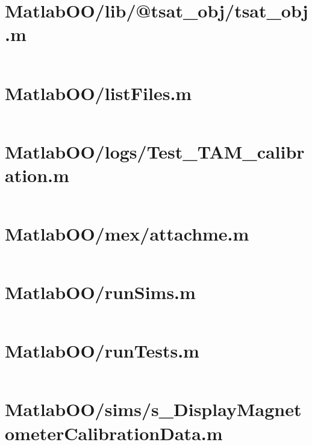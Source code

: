 \pagebreak
\section{MatlabOO/lib/@tsat\_obj/tsat\_obj.m}\label{code:MatlabOO/lib/@tsat_obj/tsat_obj.m}
\inputminted[linenos,fontsize=\scriptsize]{matlab}{/home/dcouture/git/mathyourlife/TSatPy/beta_versions/matlab_object_oriented/lib/@tsat_obj/tsat_obj.m}

\pagebreak
\section{MatlabOO/listFiles.m}\label{code:MatlabOO/listFiles.m}
\inputminted[linenos,fontsize=\scriptsize]{matlab}{/home/dcouture/git/mathyourlife/TSatPy/beta_versions/matlab_object_oriented/listFiles.m}

\pagebreak
\section{MatlabOO/logs/Test\_TAM\_calibration.m}\label{code:MatlabOO/logs/Test_TAM_calibration.m}
\inputminted[linenos,fontsize=\scriptsize]{matlab}{/home/dcouture/git/mathyourlife/TSatPy/beta_versions/matlab_object_oriented/logs/Test_TAM_calibration.m}

\pagebreak
\section{MatlabOO/mex/attachme.m}\label{code:MatlabOO/mex/attachme.m}
\inputminted[linenos,fontsize=\scriptsize]{matlab}{/home/dcouture/git/mathyourlife/TSatPy/beta_versions/matlab_object_oriented/mex/attachme.m}

\pagebreak
\section{MatlabOO/runSims.m}\label{code:MatlabOO/runSims.m}
\inputminted[linenos,fontsize=\scriptsize]{matlab}{/home/dcouture/git/mathyourlife/TSatPy/beta_versions/matlab_object_oriented/runSims.m}

\pagebreak
\section{MatlabOO/runTests.m}\label{code:MatlabOO/runTests.m}
\inputminted[linenos,fontsize=\scriptsize]{matlab}{/home/dcouture/git/mathyourlife/TSatPy/beta_versions/matlab_object_oriented/runTests.m}

\pagebreak
\section{MatlabOO/sims/s\_DisplayMagnetometerCalibrationData.m}\label{code:MatlabOO/sims/s_DisplayMagnetometerCalibrationData.m}
\inputminted[linenos,fontsize=\scriptsize]{matlab}{/home/dcouture/git/mathyourlife/TSatPy/beta_versions/matlab_object_oriented/sims/s_DisplayMagnetometerCalibrationData.m}


